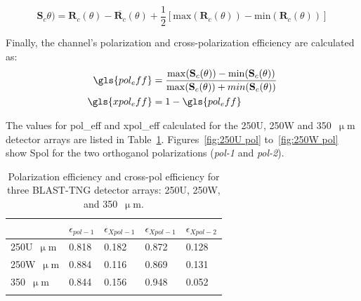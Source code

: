 \begin{equation}
  \mathbf{S}_{c}\theta) = \mathbf{R}_{c}(\theta) - \overline{\mathbf{R}_{c}}(\theta) + \frac{1}{2} \left[ \mathrm{max}\left( \mathbf{R}_{c}(\theta) \right) - \mathrm{min}\left( \mathbf{R}_{c}(\theta) \right) \right]
\end{equation}

Finally, the channel's polarization and cross-polarization efficiency are calculated as:
\begin{equation}
  \begin{aligned}
   \gls{pol_eff} &= \frac{ \mathrm{max}(\mathbf{S}_{c}(\theta)) - \mathrm{min}(\mathbf{S}_{c}(\theta)) }{ \mathrm{max}(\mathbf{S}_{c}(\theta)) + min(\mathbf{S}_{c}(\theta))} \\
   \gls{xpol_eff} &= 1 - \gls{pol_eff}
 \end{aligned}
\end{equation}

The values for \gls{pol_eff} and \gls{xpol_eff} calculated for the 250U, 250W and 350~$\upmu$m detector arrays are listed in Table~\ref{table:pol eff}. Figures~\ref{fig:250U pol} to~\ref{fig:250W pol} show \gls{Spol} for the two orthoganol polarizations (\textit{pol-1} and \textit{pol-2}).

\begin{table}[!htbp]
\centering
\begin{tabular}{@{}lllll@{}}
\dtoprule
 & $\epsilon_{pol-1}$ & $\epsilon_{Xpol-1}$ & $\epsilon_{Xpol-1}$ & $\epsilon_{Xpol-2}$ \\ \midrule
250U~$\upmu$m & 0.818 & 0.182 & 0.872 & 0.128 \\
250W~$\upmu$m & 0.884 & 0.116 & 0.869 & 0.131 \\
350~$\upmu$m & 0.844 & 0.156 & 0.948 & 0.052 \\ \dbottomrule
\\
\end{tabular}
\caption{Polarization efficiency  and cross-pol efficiency  for three BLAST-TNG detector arrays: 250U, 250W, and 350~$\upmu$m.}
\label{table:pol eff}
\end{table}

